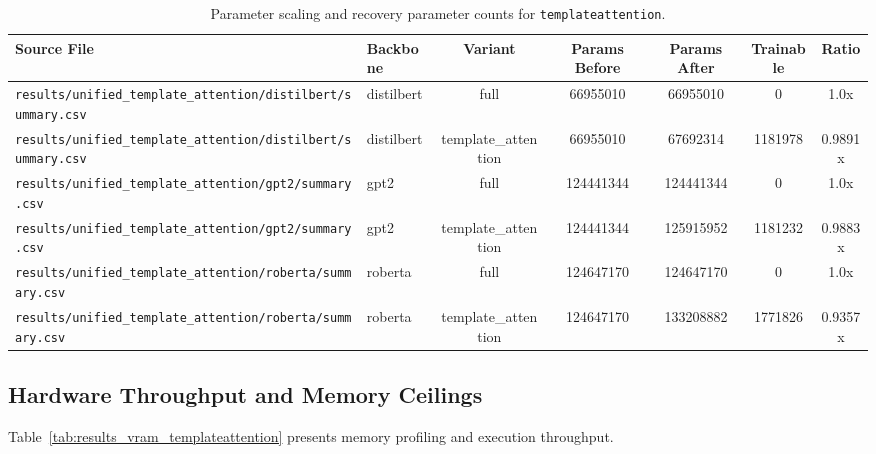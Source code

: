 \begin{table}[t]
\centering
\small
\begin{tabular}{llccccc}
\toprule
\textbf{Source File} & \textbf{Backbone} & \textbf{Variant} & \textbf{Params Before} & \textbf{Params After} & \textbf{Trainable} & \textbf{Ratio} \\
\midrule
\texttt{results/unified\_template\_attention/distilbert/summary.csv} & distilbert & full & 66955010 & 66955010 & 0 & 1.0x \\
\texttt{results/unified\_template\_attention/distilbert/summary.csv} & distilbert & template\_attention & 66955010 & 67692314 & 1181978 & 0.9891x \\
\texttt{results/unified\_template\_attention/gpt2/summary.csv} & gpt2 & full & 124441344 & 124441344 & 0 & 1.0x \\
\texttt{results/unified\_template\_attention/gpt2/summary.csv} & gpt2 & template\_attention & 124441344 & 125915952 & 1181232 & 0.9883x \\
\texttt{results/unified\_template\_attention/roberta/summary.csv} & roberta & full & 124647170 & 124647170 & 0 & 1.0x \\
\texttt{results/unified\_template\_attention/roberta/summary.csv} & roberta & template\_attention & 124647170 & 133208882 & 1771826 & 0.9357x \\
\bottomrule
\end{tabular}
\caption{Parameter scaling and recovery parameter counts for \texttt{templateattention}.}
\label{tab:results_params_templateattention}
\end{table}

\subsection{Hardware Throughput and Memory Ceilings}
Table~\ref{tab:results_vram_templateattention} presents memory profiling and execution throughput.

